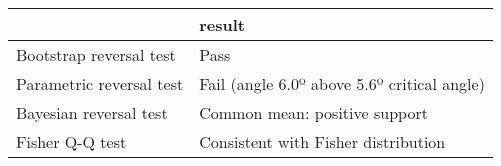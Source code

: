 \begin{tabular}{ll}
\toprule
{} &                                       result \\
\midrule
Bootstrap reversal test  &                                         Pass \\
Parametric reversal test &  Fail (angle 6.0º above 5.6º critical angle) \\
Bayesian reversal test   &                Common mean: positive support \\
Fisher Q-Q test          &          Consistent with Fisher distribution \\
\bottomrule
\end{tabular}
